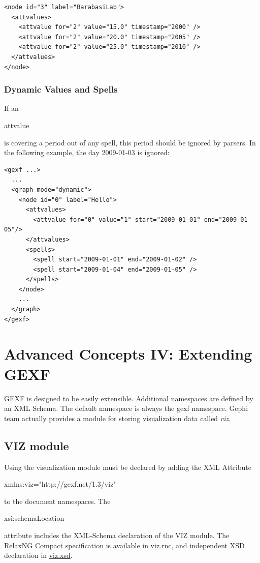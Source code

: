 \documentclass[a4paper,10pt]{article}
\begin{document}
\lstset{ style=gexf }
\begin{lstlisting}[caption={Using timestamp representation}]
<node id="3" label="BarabasiLab">
  <attvalues>
    <attvalue for="2" value="15.0" timestamp="2000" />
    <attvalue for="2" value="20.0" timestamp="2005" />
    <attvalue for="2" value="25.0" timestamp="2010" />
  </attvalues>
</node>
\end{lstlisting}

\subsubsection{Dynamic Values and Spells}

If an \begin{footnotesize}attvalue\end{footnotesize} is covering a period out of any spell, this period should be ignored by parsers. In the following example, the day 2009-01-03 is ignored:

\lstset{ style=gexf }
\begin{lstlisting}[caption={Spells and attvalues}]
<gexf ...>
  ...
  <graph mode="dynamic">
    <node id="0" label="Hello">
      <attvalues>
        <attvalue for="0" value="1" start="2009-01-01" end="2009-01-05"/>
      </attvalues>
      <spells>
        <spell start="2009-01-01" end="2009-01-02" />
        <spell start="2009-01-04" end="2009-01-05" />
      </spells>
    </node>
    ...
  </graph>
</gexf>
\end{lstlisting}

\section{Advanced Concepts IV: Extending GEXF} \label{extendgexf}

GEXF is designed to be easily extensible. Additional namespaces are defined by an XML Schema. The default namespace is always the gexf namespace. Gephi team actually provides a module for storing visualization data called \textit{viz}.

\subsection{VIZ module} \label{viz}

Using the visualization module must be declared by adding the XML Attribute \begin{footnotesize}xmlns:viz="http://gexf.net/1.3/viz"\end{footnotesize} to the document namespaces. The \begin{footnotesize}xsi:schemaLocation\end{footnotesize} attribute includes the XML-Schema declaration of the VIZ module. The RelaxNG Compact specification is available in \href{http://gexf.net/1.3/viz.rnc}{viz.rnc}, and independent XSD declaration in \href{http://gexf.net/1.3/viz.xsd}{viz.xsd}.
\end{document}
